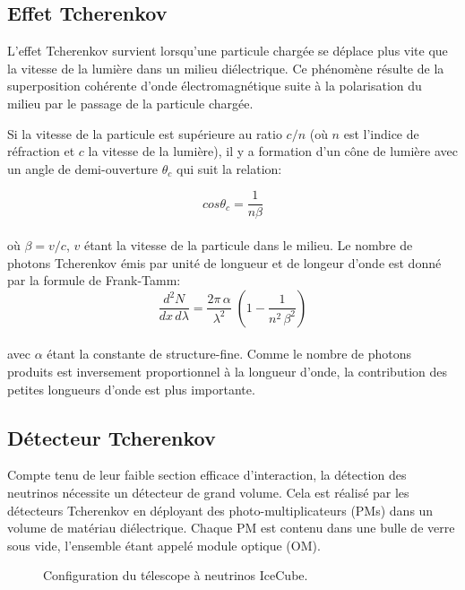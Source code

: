 \subsection{Effet Tcherenkov}

L'effet Tcherenkov survient lorsqu'une particule chargée se déplace plus vite que la vitesse de la lumière dans un milieu diélectrique. Ce phénomène résulte de la superposition cohérente d'onde électromagnétique suite à la polarisation du milieu par le passage de la particule chargée.

Si la vitesse de la particule est supérieure au ratio $c/n$ (où $n$ est l'indice de réfraction et $c$ la vitesse de la lumière), il y a formation d'un cône de lumière avec un angle de demi-ouverture $\theta_c$ qui suit la relation:

\begin{equation}
    cos\theta_c = \frac{1}{n\beta}
\end{equation}\\

où $\beta = v/c$, $v$ étant la vitesse de la particule dans le milieu. Le nombre de photons Tcherenkov émis par unité de longueur et de longeur d'onde est donné par la formule de Frank-Tamm: \\

\begin{equation}
     \frac{d^2N}{dx \, d\lambda} = \frac{2\pi \, \alpha}{\lambda^2} \; (1- \frac{1}{n^2 \, \beta^2} )
\end{equation}\\

avec $\alpha$ étant la constante de structure-fine. Comme le nombre de photons produits est inversement proportionnel à la longueur d'onde, la contribution des petites longueurs d'onde est plus importante.

\subsection{Détecteur Tcherenkov}

Compte tenu de leur faible section efficace d'interaction, la détection des neutrinos nécessite un détecteur de grand volume. Cela est réalisé par les détecteurs Tcherenkov en déployant des photo-multiplicateurs (PMs) dans un volume de matériau diélectrique. Chaque PM est contenu dans une bulle de verre sous vide, l'ensemble étant appelé module optique (OM).\\


\begin{figure}[h!]
    \caption{\label{fig:IceCube} Configuration du télescope à neutrinos IceCube.}
\end{figure}


